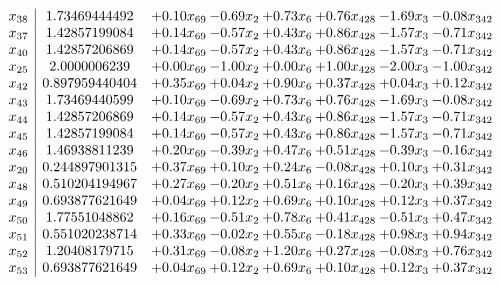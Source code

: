 \documentclass[8pt]{article}
\begin{document}
\[\begin{array}{c| c c@{\hskip 2pt} c@{\hskip 2pt} c@{\hskip 2pt} c@{\hskip 2pt} c@{\hskip 2pt} c@{\hskip 2pt} }
 x_{38}   &  1.73469444492 & +  0.10 x_{69} & -0.69 x_{2} & +  0.73 x_{6} & +  0.76 x_{428} & -1.69 x_{3} & -0.08 x_{342}\\
 x_{37}   &  1.42857199084 & +  0.14 x_{69} & -0.57 x_{2} & +  0.43 x_{6} & +  0.86 x_{428} & -1.57 x_{3} & -0.71 x_{342}\\
 x_{40}   &  1.42857206869 & +  0.14 x_{69} & -0.57 x_{2} & +  0.43 x_{6} & +  0.86 x_{428} & -1.57 x_{3} & -0.71 x_{342}\\
 x_{25}   &  2.0000006239 & +  0.00 x_{69} & -1.00 x_{2} & +  0.00 x_{6} & +  1.00 x_{428} & -2.00 x_{3} & -1.00 x_{342}\\
 x_{42}   &  0.897959440404 & +  0.35 x_{69} & +  0.04 x_{2} & +  0.90 x_{6} & +  0.37 x_{428} & +  0.04 x_{3} & +  0.12 x_{342}\\
 x_{43}   &  1.73469440599 & +  0.10 x_{69} & -0.69 x_{2} & +  0.73 x_{6} & +  0.76 x_{428} & -1.69 x_{3} & -0.08 x_{342}\\
 x_{44}   &  1.42857206869 & +  0.14 x_{69} & -0.57 x_{2} & +  0.43 x_{6} & +  0.86 x_{428} & -1.57 x_{3} & -0.71 x_{342}\\
 x_{45}   &  1.42857199084 & +  0.14 x_{69} & -0.57 x_{2} & +  0.43 x_{6} & +  0.86 x_{428} & -1.57 x_{3} & -0.71 x_{342}\\
 x_{46}   &  1.46938811239 & +  0.20 x_{69} & -0.39 x_{2} & +  0.47 x_{6} & +  0.51 x_{428} & -0.39 x_{3} & -0.16 x_{342}\\
 x_{20}   &  0.244897901315 & +  0.37 x_{69} & +  0.10 x_{2} & +  0.24 x_{6} & -0.08 x_{428} & +  0.10 x_{3} & +  0.31 x_{342}\\
 x_{48}   &  0.510204194967 & +  0.27 x_{69} & -0.20 x_{2} & +  0.51 x_{6} & +  0.16 x_{428} & -0.20 x_{3} & +  0.39 x_{342}\\
 x_{49}   &  0.693877621649 & +  0.04 x_{69} & +  0.12 x_{2} & +  0.69 x_{6} & +  0.10 x_{428} & +  0.12 x_{3} & +  0.37 x_{342}\\
 x_{50}   &  1.77551048862 & +  0.16 x_{69} & -0.51 x_{2} & +  0.78 x_{6} & +  0.41 x_{428} & -0.51 x_{3} & +  0.47 x_{342}\\
 x_{51}   &  0.551020238714 & +  0.33 x_{69} & -0.02 x_{2} & +  0.55 x_{6} & -0.18 x_{428} & +  0.98 x_{3} & +  0.94 x_{342}\\
 x_{52}   &  1.20408179715 & +  0.31 x_{69} & -0.08 x_{2} & +  1.20 x_{6} & +  0.27 x_{428} & -0.08 x_{3} & +  0.76 x_{342}\\
 x_{53}   &  0.693877621649 & +  0.04 x_{69} & +  0.12 x_{2} & +  0.69 x_{6} & +  0.10 x_{428} & +  0.12 x_{3} & +  0.37 x_{342}\\

\end{array}\]
\end{document}
